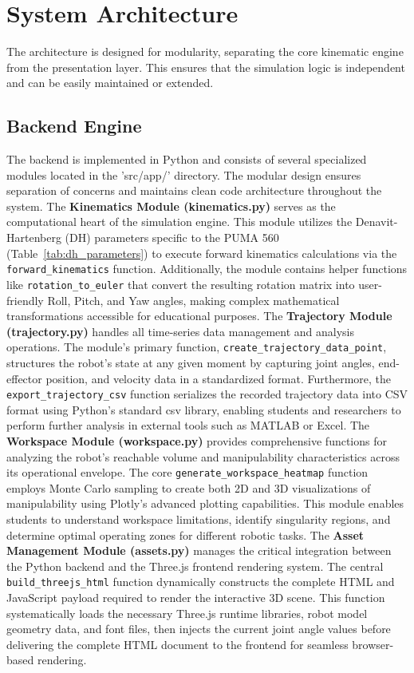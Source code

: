 \documentclass[conference]{IEEEtran}
\begin{document}
\section{System Architecture}
The architecture is designed for modularity, separating the core kinematic engine from the presentation layer. This ensures that the simulation logic is independent and can be easily maintained or extended.

\subsection{Backend Engine}
The backend is implemented in Python and consists of several specialized modules located in the 'src/app/' directory. The modular design ensures separation of concerns and maintains clean code architecture throughout the system.
The \textbf{Kinematics Module (kinematics.py)} serves as the computational heart of the simulation engine. This module utilizes the Denavit-Hartenberg (DH) parameters specific to the PUMA 560 (Table~\ref{tab:dh_parameters}) to execute forward kinematics calculations via the \texttt{forward\_kinematics} function. Additionally, the module contains helper functions like \texttt{rotation\_to\_euler} that convert the resulting rotation matrix into user-friendly Roll, Pitch, and Yaw angles, making complex mathematical transformations accessible for educational purposes.
The \textbf{Trajectory Module (trajectory.py)} handles all time-series data management and analysis operations. The module's primary function, \texttt{create\_trajectory\_data\_point}, structures the robot's state at any given moment by capturing joint angles, end-effector position, and velocity data in a standardized format. Furthermore, the \texttt{export\_trajectory\_csv} function serializes the recorded trajectory data into CSV format using Python's standard csv library, enabling students and researchers to perform further analysis in external tools such as MATLAB or Excel.
The \textbf{Workspace Module (workspace.py)} provides comprehensive functions for analyzing the robot's reachable volume and manipulability characteristics across its operational envelope. The core \texttt{generate\_workspace\_heatmap} function employs Monte Carlo sampling to create both 2D and 3D visualizations of manipulability using Plotly's advanced plotting capabilities. This module enables students to understand workspace limitations, identify singularity regions, and determine optimal operating zones for different robotic tasks.
The \textbf{Asset Management Module (assets.py)} manages the critical integration between the Python backend and the Three.js frontend rendering system. The central \texttt{build\_threejs\_html} function dynamically constructs the complete HTML and JavaScript payload required to render the interactive 3D scene. This function systematically loads the necessary Three.js runtime libraries, robot model geometry data, and font files, then injects the current joint angle values before delivering the complete HTML document to the frontend for seamless browser-based rendering.
\end{document}
